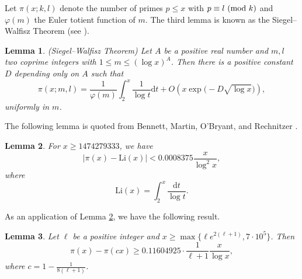 \documentclass[12pt,a4paper,reqno]{amsart}
\numberwithin{equation}{section}
\def\pmod #1{\ ({\rm{mod}}\ #1)}
\def\Li{{\mathrm{Li}}}
\def\d{{\mathrm{d}}}
\theoremstyle{plain}
\newtheorem{lemma}{Lemma}
\theoremstyle{definition}
\begin{document}
Let $\pi(x;k,l)$ denote the number of primes $p\leq x$ with $p\equiv l \pmod{k}$ and $\varphi(m)$ the Euler totient function of $m$. The third lemma is known as the Siegel--Walfisz Theorem (see \cite[Chapter 22]{Davenport1980}).
 
 \begin{lemma} (Siegel--Walfisz Theorem) \label{pi(x;m,l)=} Let $A$ be a positive real number and $m, l$ two coprime
 	integers with $1\le m\le (\log x)^A$. Then there is a positive
 	constant $D$ depending only on $A$ such that
 	$$\pi (x;m,l)=\frac 1{\varphi (m)} \int_2^x \frac 1{\log t} \d t +O\left(x \exp \big(-D \sqrt{\log x}\big)\right), $$
 	uniformly in $m$.
 \end{lemma}
 
  The following lemma is quoted from Bennett, Martin, O'Bryant, and Rechnitzer \cite[(1.15)]{Bennett/Martin} .
 \begin{lemma}\label{lem-1} For $x\ge 1474279333$, we have
 	$$\big|\pi (x)-\Li (x)\big|<0.0008375\frac{x}{\log^2 x}, $$
 	where
 	$$\Li (x)=\int_2^x \frac{\d t}{\log t} .$$
 \end{lemma}
 As an application of Lemma \ref{lem-1}, we have the following result. 
 
 \begin{lemma}\label{lem-2}
 	Let $\ell$ be a positive integer and $x\geq \max\{\ell e^{2(\ell+1)},7\cdot 10^{5}\}$. Then
 	\begin{equation*}
 		\pi(x)-\pi(cx)\geq 0.11604925 \cdot \frac{1}{\ell+1} \frac{x}{\log x},
 	\end{equation*}
 	where $c=1-\frac{1}{8(\ell+1)}$.
 \end{lemma}
 
\end{document}
